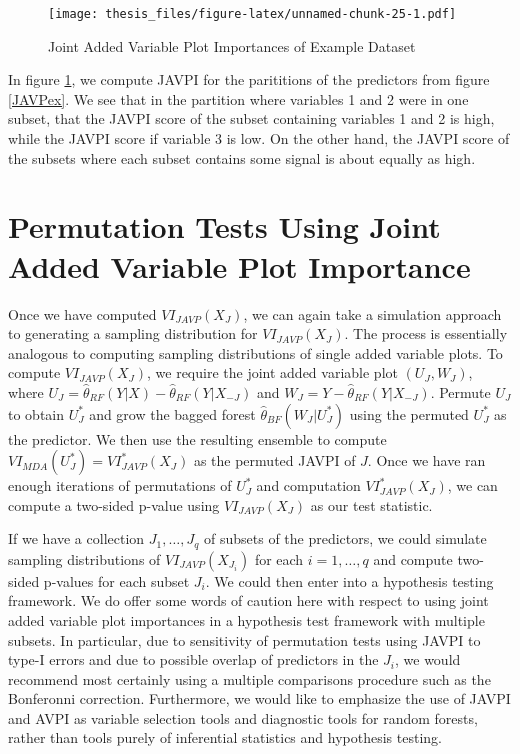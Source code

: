 \documentclass[12pt,twoside]{reedthesis}
\theoremstyle{definition}
\theoremstyle{definition}
\theoremstyle{definition}
\theoremstyle{remark}
\begin{document}
\begin{figure}
\centering
\texttt{[image: thesis\_files/figure-latex/unnamed-chunk-25-1.pdf]}
\caption{\label{fig:unnamed-chunk-25}\label{JAVPIex}Joint Added Variable
Plot Importances of Example Dataset}
\end{figure}
In figure \ref{JAVPIex}, we compute JAVPI for the parititions of the
predictors from figure \ref{JAVPex}. We see that in the partition where
variables 1 and 2 were in one subset, that the JAVPI score of the subset
containing variables 1 and 2 is high, while the JAVPI score if variable
3 is low. On the other hand, the JAVPI score of the subsets where each
subset contains some signal is about equally as high. \par

\section{Permutation Tests Using Joint Added Variable Plot
Importance}\label{permutation-tests-using-joint-added-variable-plot-importance}

Once we have computed \(VI_{JAVP}(X_J)\), we can again take a simulation
approach to generating a sampling distribution for \(VI_{JAVP}(X_J)\).
The process is essentially analogous to computing sampling distributions
of single added variable plots. To compute \(VI_{JAVP}(X_J)\), we
require the joint added variable plot \((U_J,W_J)\), where
\(U_J=\hat{\theta}_{RF}(Y|X)-\hat{\theta}_{RF}(Y|X_{-J})\) and
\(W_J=Y-\hat{\theta}_{RF}(Y|X_{-J})\). Permute \(U_J\) to obtain
\(U_J^*\) and grow the bagged forest \(\hat{\theta}_{BF}(W_J|U_J^*)\)
using the permuted \(U_J^*\) as the predictor. We then use the resulting
ensemble to compute \(VI_{MDA}(U_J^*)=VI_{JAVP}^*(X_J)\) as the permuted
JAVPI of \(J\). Once we have ran enough iterations of permutations of
\(U_J^*\) and computation \(VI_{JAVP}^*(X_J)\), we can compute a
two-sided p-value using \(VI_{JAVP}(X_J)\) as our test statistic. \par

If we have a collection \(J_1,\ldots, J_q\) of subsets of the
predictors, we could simulate sampling distributions of
\(VI_{JAVP}(X_{J_i})\) for each \(i=1,\ldots,q\) and compute two-sided
p-values for each subset \(J_i\). We could then enter into a hypothesis
testing framework. We do offer some words of caution here with respect
to using joint added variable plot importances in a hypothesis test
framework with multiple subsets. In particular, due to sensitivity of
permutation tests using JAVPI to type-I errors and due to possible
overlap of predictors in the \(J_i\), we would recommend most certainly
using a multiple comparisons procedure such as the Bonferonni
correction. Furthermore, we would like to emphasize the use of JAVPI and
AVPI as variable selection tools and diagnostic tools for random
forests, rather than tools purely of inferential statistics and
hypothesis testing. \par
\end{document}
